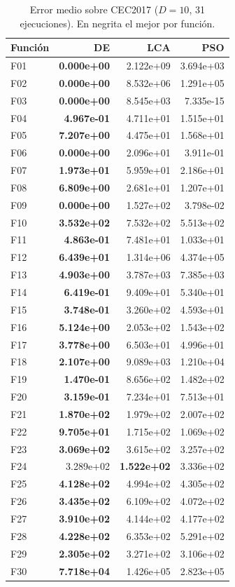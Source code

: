 \begin{table}[h!]
\centering
\caption{Error medio sobre CEC2017 ($D=10$, 31 ejecuciones). En negrita el mejor por función.}
\label{tab:res_d10}
\footnotesize
\renewcommand{\arraystretch}{1.1}
\begin{tabular}{@{}lrrr@{}}
\toprule
\textbf{Función} & \textbf{DE} & \textbf{LCA} & \textbf{PSO} \\
\midrule
F01 & \textbf{0.000e+00} & 2.122e+09 & 3.694e+03 \\
F02 & \textbf{0.000e+00} & 8.532e+06 & 1.291e+05 \\
F03 & \textbf{0.000e+00} & 8.545e+03 & 7.335e-15 \\
F04 & \textbf{4.967e-01} & 4.711e+01 & 1.515e+01 \\
F05 & \textbf{7.207e+00} & 4.475e+01 & 1.568e+01 \\
F06 & \textbf{0.000e+00} & 2.096e+01 & 3.911e-01 \\
F07 & \textbf{1.973e+01} & 5.959e+01 & 2.186e+01 \\
F08 & \textbf{6.809e+00} & 2.681e+01 & 1.207e+01 \\
F09 & \textbf{0.000e+00} & 1.527e+02 & 3.798e-02 \\
F10 & \textbf{3.532e+02} & 7.532e+02 & 5.513e+02 \\
F11 & \textbf{4.863e-01} & 7.481e+01 & 1.033e+01 \\
F12 & \textbf{6.439e+01} & 1.314e+06 & 4.374e+05 \\
F13 & \textbf{4.903e+00} & 3.787e+03 & 7.385e+03 \\
F14 & \textbf{6.419e-01} & 9.409e+01 & 5.340e+01 \\
F15 & \textbf{3.748e-01} & 3.260e+02 & 4.593e+01 \\
F16 & \textbf{5.124e+00} & 2.053e+02 & 1.543e+02 \\
F17 & \textbf{3.778e+00} & 6.503e+01 & 4.996e+01 \\
F18 & \textbf{2.107e+00} & 9.089e+03 & 1.210e+04 \\
F19 & \textbf{1.470e-01} & 8.656e+02 & 1.482e+02 \\
F20 & \textbf{3.159e-01} & 7.234e+01 & 7.513e+01 \\
F21 & \textbf{1.870e+02} & 1.979e+02 & 2.007e+02 \\
F22 & \textbf{9.705e+01} & 1.715e+02 & 1.069e+02 \\
F23 & \textbf{3.069e+02} & 3.615e+02 & 3.257e+02 \\
F24 & 3.289e+02 & \textbf{1.522e+02} & 3.336e+02 \\
F25 & \textbf{4.128e+02} & 4.994e+02 & 4.305e+02 \\
F26 & \textbf{3.435e+02} & 6.109e+02 & 4.072e+02 \\
F27 & \textbf{3.910e+02} & 4.144e+02 & 4.177e+02 \\
F28 & \textbf{4.228e+02} & 6.353e+02 & 5.291e+02 \\
F29 & \textbf{2.305e+02} & 3.271e+02 & 3.106e+02 \\
F30 & \textbf{7.718e+04} & 1.426e+05 & 2.823e+05 \\
\bottomrule
\end{tabular}
\end{table}

